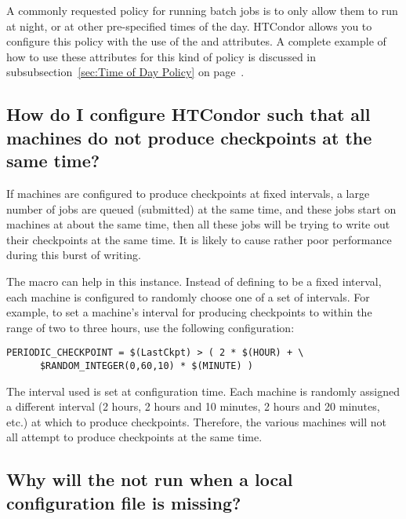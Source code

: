 A commonly requested policy for running batch jobs is to only allow
them to run at night, or at other pre-specified times of the day.
HTCondor allows you to configure this policy with the use of the
 and   attributes.  
A complete example of how to use these attributes for this kind of
policy is discussed in subsubsection~\ref{sec:Time of Day Policy} on
page~\pageref{sec:Time of Day Policy}.


\subsection*{How do I configure HTCondor such that all machines do not produce checkpoints at the same time?}
\label{sec:randomintegerusage}
If machines are configured to produce checkpoints at fixed intervals,
a large number of jobs are queued (submitted) at the same time,
and these jobs start on machines at about the same time,
then all these jobs will be trying to write out their checkpoints
at the same time.
It is likely to cause rather poor performance during this burst of
writing.

The  macro can help in this instance.
Instead of defining  to be a fixed
interval, each machine is configured to randomly choose 
one of a set of intervals.
For example, to set a machine's interval for producing checkpoints
to within the range of two to three hours, use the following
configuration:
\footnotesize
\begin{verbatim}
PERIODIC_CHECKPOINT = $(LastCkpt) > ( 2 * $(HOUR) + \
      $RANDOM_INTEGER(0,60,10) * $(MINUTE) )
\end{verbatim}
\normalsize

The interval used is set at configuration time.
Each machine is randomly assigned a different interval 
(2 hours, 2 hours and 10 minutes, 2 hours and 20 minutes, etc.)
at which to produce checkpoints.
Therefore, the various machines will not all attempt to
produce checkpoints at the same time.

\subsection*{Why will the  not run when a local configuration file is missing?}

